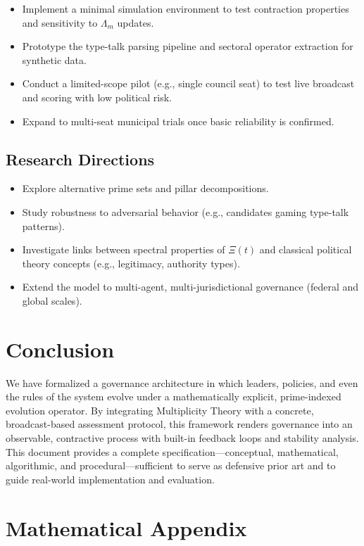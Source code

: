 \documentclass[11pt]{article}
\begin{document}
\begin{itemize}[leftmargin=1.5em]
    \item Implement a minimal simulation environment to test contraction properties and sensitivity to \(\Lambda_m\) updates.
    \item Prototype the type-talk parsing pipeline and sectoral operator extraction for synthetic data.
    \item Conduct a limited-scope pilot (e.g., single council seat) to test live broadcast and scoring with low political risk.
    \item Expand to multi-seat municipal trials once basic reliability is confirmed.
\end{itemize}

\subsection{Research Directions}

\begin{itemize}[leftmargin=1.5em]
    \item Explore alternative prime sets and pillar decompositions.
    \item Study robustness to adversarial behavior (e.g., candidates gaming type-talk patterns).
    \item Investigate links between spectral properties of \(\Xi(t)\) and classical political theory concepts (e.g., legitimacy, authority types).
    \item Extend the model to multi-agent, multi-jurisdictional governance (federal and global scales).
\end{itemize}

\section*{Conclusion}

We have formalized a governance architecture in which leaders, policies, and even the rules of the system evolve under a mathematically explicit, prime-indexed evolution operator. By integrating Multiplicity Theory with a concrete, broadcast-based assessment protocol, this framework renders governance into an observable, contractive process with built-in feedback loops and stability analysis. This document provides a complete specification---conceptual, mathematical, algorithmic, and procedural---sufficient to serve as defensive prior art and to guide real-world implementation and evaluation.
\newpage
\appendix
\section*{Mathematical Appendix}
\end{document}

